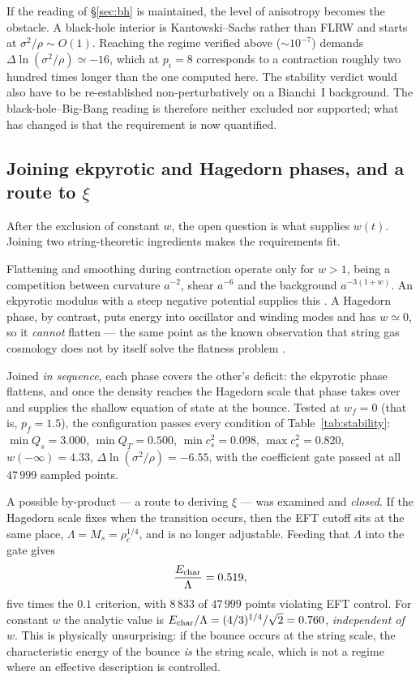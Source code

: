 \documentclass[a4paper,11pt]{article}
\begin{document}
If the reading of \S\ref{sec:bh} is maintained, the level of anisotropy becomes the obstacle. A black-hole interior is Kantowski--Sachs rather than FLRW and starts at $\sigma^{2}/\rho\sim O(1)$. Reaching the regime verified above ($\sim10^{-7}$) demands $\Delta\ln(\sigma^{2}/\rho)\simeq-16$, which at $p_i=8$ corresponds to a contraction roughly two hundred times longer than the one computed here. The stability verdict would also have to be re-established non-perturbatively on a Bianchi~I background. The black-hole--Big-Bang reading is therefore neither excluded nor supported; what has changed is that the requirement is now quantified.

\subsection{Joining ekpyrotic and Hagedorn phases, and a route to $\xi$}

After the exclusion of constant $w$, the open question is what supplies $w(t)$. Joining two string-theoretic ingredients makes the requirements fit.

Flattening and smoothing during contraction operate only for $w>1$, being a competition between curvature $a^{-2}$, shear $a^{-6}$ and the background $a^{-3(1+w)}$. An ekpyrotic modulus with a steep negative potential supplies this \cite{Khoury}. A Hagedorn phase, by contrast, puts energy into oscillator and winding modes and has $w\simeq0$, so it \emph{cannot} flatten --- the same point as the known observation that string gas cosmology does not by itself solve the flatness problem \cite{Brandenberger}.

Joined \emph{in sequence}, each phase covers the other's deficit: the ekpyrotic phase flattens, and once the density reaches the Hagedorn scale that phase takes over and supplies the shallow equation of state at the bounce. Tested at $w_f=0$ (that is, $p_f=1.5$), the configuration passes every condition of Table~\ref{tab:stability}: $\min Q_s=3.000$, $\min Q_T=0.500$, $\min c_s^{2}=0.098$, $\max c_s^{2}=0.820$, $w(-\infty)=4.33$, $\Delta\ln(\sigma^{2}/\rho)=-6.55$, with the coefficient gate passed at all $47\,999$ sampled points.

A possible by-product --- a route to deriving $\xi$ --- was examined and \emph{closed}. If the Hagedorn scale fixes when the transition occurs, then the EFT cutoff sits at the same place, $\Lambda=M_s=\rho_c^{1/4}$, and is no longer adjustable. Feeding that $\Lambda$ into the gate gives
\begin{equation}
\frac{E_{\rm char}}{\Lambda}=0.519,
\end{equation}
five times the $0.1$ criterion, with $8\,833$ of $47\,999$ points violating EFT control. For constant $w$ the analytic value is $E_{\rm char}/\Lambda=(4/3)^{1/4}/\sqrt2=0.760$, \emph{independent of $w$}. This is physically unsurprising: if the bounce occurs at the string scale, the characteristic energy of the bounce \emph{is} the string scale, which is not a regime where an effective description is controlled.
\end{document}
